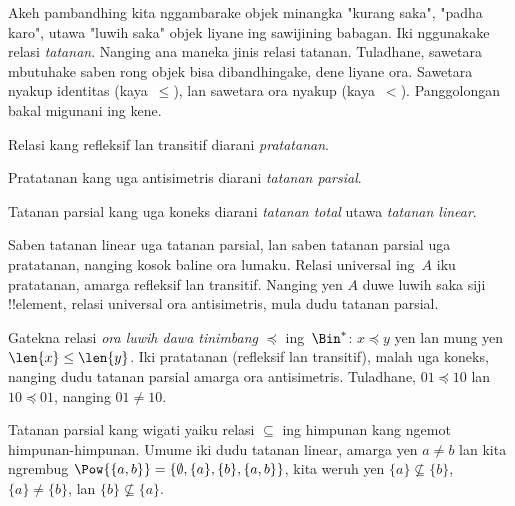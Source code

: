 \documentclass[../../../include/open-logic-section]{subfiles}
\begin{document}

\begin{explain}
Akeh pambandhing kita nggambarake objek minangka
"kurang saka", "padha karo", utawa "luwih saka" objek
liyane ing sawijining babagan. Iki nggunakake relasi
\emph{tatanan}. Nanging ana maneka jinis relasi tatanan.
Tuladhane, sawetara mbutuhake saben rong objek bisa
dibandhingake, dene liyane ora.
Sawetara nyakup identitas (kaya~$\le$), lan sawetara
ora nyakup (kaya~$<$).
Panggolongan bakal migunani ing kene.
\end{explain}

\begin{defn}[Pratatanan]
Relasi kang refleksif lan transitif diarani \emph{pratatanan}.
\end{defn}

\begin{defn}
Pratatanan kang uga antisimetris diarani \emph{tatanan parsial}.
\end{defn}

\begin{defn}
Tatanan parsial kang uga koneks diarani
\emph{tatanan total} utawa \emph{tatanan linear}.
\end{defn}

\begin{ex}
Saben tatanan linear uga tatanan parsial, lan saben
tatanan parsial uga pratatanan, nanging kosok baline
ora lumaku. Relasi universal ing~$A$ iku pratatanan,
amarga refleksif lan transitif. Nanging yen $A$ duwe
luwih saka siji !!{element}, relasi universal ora
antisimetris, mula dudu tatanan parsial.
\end{ex}

\begin{ex}
Gatekna relasi \emph{ora luwih dawa tinimbang}
$\preccurlyeq$ ing~$\Bin^*$:
$x \preccurlyeq y$ yen lan mung yen
$\len{x} \le \len{y}$.
Iki pratatanan (refleksif lan transitif), malah uga
koneks, nanging dudu tatanan parsial amarga ora
antisimetris. Tuladhane, $01\preccurlyeq 10$ lan
$10 \preccurlyeq 01$, nanging $01 \neq 10$.
\end{ex}

\begin{ex}
Tatanan parsial kang wigati yaiku relasi $\subseteq$
ing himpunan kang ngemot himpunan-himpunan.
Umume iki dudu tatanan linear, amarga yen $a \neq b$
lan kita ngrembug
$\Pow{\{a, b\}} = \{\emptyset, \{a\}, \{b\}, \{a,b\}\}$,
kita weruh yen $\{a\} \nsubseteq \{b\}$,
$\{a\} \neq \{b\}$, lan $\{b\}\nsubseteq \{a\}$.
\end{ex}
\end{document}
